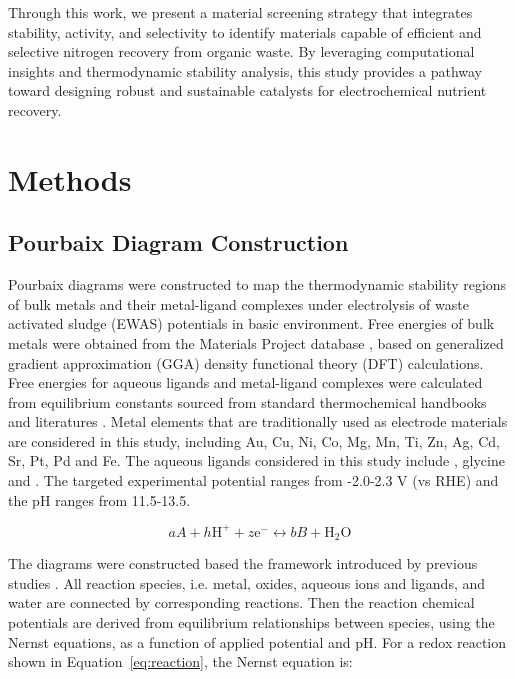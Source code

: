 \documentclass[journal=jacsat,manuscript=article]{achemso}
\begin{document}
Through this work, we present a material screening strategy that integrates stability, activity, and selectivity to identify materials capable of efficient and selective nitrogen recovery from organic waste. By leveraging computational insights and thermodynamic stability analysis, this study provides a pathway toward designing robust and sustainable catalysts for electrochemical nutrient recovery.


\section{Methods}
\subsection{Pourbaix Diagram Construction}
Pourbaix diagrams were constructed to map the thermodynamic stability regions of bulk metals and their metal-ligand complexes under electrolysis of waste activated sludge (EWAS) potentials in basic environment. Free energies of bulk metals were obtained from the Materials Project database \cite{Jain2013TheInnovation}, based on generalized gradient approximation (GGA) density functional theory (DFT) calculations. Free energies for aqueous ligands and metal-ligand complexes were calculated from equilibrium constants sourced from standard thermochemical handbooks \cite{MartellCriticalSupplement, Smith1976CriticalConstants, Bard2017StandardSolution} and literatures \cite{Meng1996PrinciplesReview, Azadi2019DataComplexes, Aviles2022ExploringNH3, Oraby2023SelectiveSolutions}. Metal elements that are traditionally used as electrode materials are considered in this study, including Au, Cu, Ni, Co, Mg, Mn, Ti, Zn, Ag, Cd, Sr, Pt, Pd and Fe. The aqueous ligands considered in this study include , glycine and . The targeted experimental potential ranges from -2.0-2.3 V (vs RHE) and the pH ranges from 11.5-13.5.

\begin{equation} \label{eq:reaction}
aA + h\text{H}^+ + z\text{e}^- \leftrightarrow bB + \text{H}_2\text{O}
\end{equation}

The diagrams were constructed based the framework introduced by previous studies \cite{PourbaixAtlasSolutions, Huang2017ImprovedCompounds, Huang2015ElectrochemicalCalculations,Singh2017ElectrochemicalMaterials,Patel2019EfficientCompounds,Persson2012PredictionStates}. All reaction species, i.e. metal, oxides, aqueous ions and ligands, and water are connected by corresponding reactions. Then the reaction chemical potentials are derived from equilibrium relationships between species, using the Nernst equations, as a function of applied potential and pH. For a redox reaction shown in Equation~\eqref{eq:reaction}, the Nernst equation is:
\end{document}
